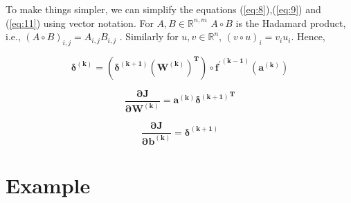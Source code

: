 \documentclass{article}
\begin{document}
To make things simpler, we can simplify the equations (\ref{eq:8}),(\ref{eq:9}) and (\ref{eq:11}) using vector notation. For $A,B \in \mathbb{R}^{n,m}$ $A\circ B$ is the  Hadamard product, i.e., $(A\circ B)_{i,j} = A_{i,j}B_{i,j}$ . Similarly for $u,v \in \mathbb{R}^{n}$, $(v\circ u)_{i} = v_{i}u_{i}$. Hence,  

\begin{equation}\label{eq:8sim}
\bm{\delta^{(k)} = (\delta^{(k+1)} {(W^{(k)})}^{T}) \circ {f^{\prime}}^{(k-1)} (a^{(k)})}
\end{equation}

\begin{equation}\label{eq:9sim}
\bm{\frac{\partial J}{\partial  W^{(k)}} = {a^{(k)} \delta^{(k+1)}}^{T}}
\end{equation}

\begin{equation}\label{eq:11sim}
\bm{\frac{\partial J}{\partial  b^{(k)}} =  \delta^{(k+1)}}
\end{equation}

\pagebreak

\section{Example}
\end{document}
